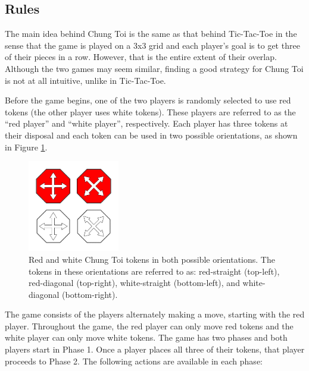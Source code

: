 \documentclass[11pt,a4paper]{report}
\begin{document}
\subsection{Rules}
\label{sec:ChungToiRules}

The main idea behind Chung Toi \cite{chung-toi-rules} is the same as that behind Tic-Tac-Toe in the sense that the game is played on a 3x3 grid and each player's goal is to get three of their pieces in a row. However, that is the entire extent of their overlap. Although the two games may seem similar, finding a good strategy for Chung Toi is not at all intuitive, unlike in Tic-Tac-Toe.

Before the game begins, one of the two players is randomly selected to use red tokens (the other player uses white tokens). These players are referred to as the ``red player'' and ``white player'', respectively. Each player has three tokens at their disposal and each token can be used in two possible orientations, as shown in Figure \ref{chung-toi-tokens}.

\begin{figure}[htbp]
	\begin{center}
		\includegraphics[width=40mm]{chung_toi_tokens.png}
		\caption[Chung Toi tokens]{Red and white Chung Toi tokens in both possible orientations. The tokens in these orientations are referred to as: red-straight (top-left), red-diagonal (top-right), white-straight (bottom-left), and white-diagonal (bottom-right).}
		\label{chung-toi-tokens}
	\end{center}
\end{figure}

The game consists of the players alternately making a move, starting with the red player. Throughout the game, the red player can only move red tokens and the white player can only move white tokens. The game has two phases and both players start in Phase 1. Once a player places all three of their tokens, that player proceeds to Phase 2. The following actions are available in each phase:
\end{document}
